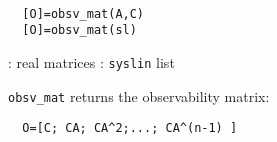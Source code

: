 \begin{mandesc}
   \\ %
\end{mandesc}
\begin{calling_sequence}
\begin{verbatim}
  [O]=obsv_mat(A,C)  
  [O]=obsv_mat(sl)  
\end{verbatim}
\end{calling_sequence}
\begin{parameters}
  \begin{varlist}
    : real matrices
    : \verb!syslin! list
  \end{varlist}
\end{parameters}
\begin{mandescription}
  \verb!obsv_mat! returns the observability matrix:
\begin{verbatim}
  O=[C; CA; CA^2;...; CA^(n-1) ]
\end{verbatim}
\end{mandescription}
\begin{manseealso}
      
\end{manseealso}
